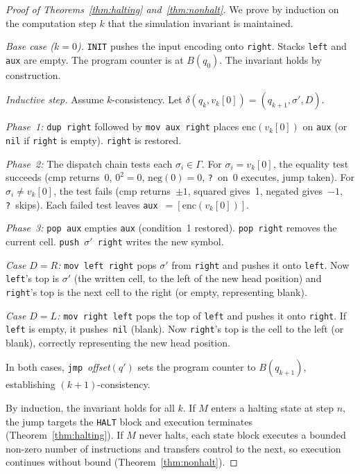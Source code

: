 \begin{proof}[Proof of Theorems~\ref{thm:halting} and~\ref{thm:nonhalt}]
We prove by induction on the computation step $k$ that the simulation invariant is maintained.

\textit{Base case ($k = 0$).}
\texttt{INIT} pushes the input encoding onto \texttt{right}. Stacks \texttt{left} and \texttt{aux} are empty. The program counter is at $B(q_0)$. The invariant holds by construction.

\textit{Inductive step.}
Assume $k$-consistency. Let $\delta(q_k, v_k[0]) = (q_{k+1}, \sigma', D)$.

\textit{Phase~1:} \texttt{dup right} followed by \texttt{mov aux right} places $\mathrm{enc}(v_k[0])$ on \texttt{aux} (or \texttt{nil} if \texttt{right} is empty). \texttt{right} is restored.

\textit{Phase~2:} The dispatch chain tests each $\sigma_i \in \Gamma$. For $\sigma_i = v_k[0]$, the equality test succeeds (cmp returns~0, $0^2 = 0$, $\mathrm{neg}(0) = 0$, \texttt{?}~on~0 executes, jump taken). For $\sigma_i \neq v_k[0]$, the test fails ($\mathrm{cmp}$ returns~$\pm 1$, squared gives~1, negated gives~$-1$, \texttt{?}~skips). Each failed test leaves \texttt{aux}~$= [\mathrm{enc}(v_k[0])]$.

\textit{Phase~3:} \texttt{pop aux} empties \texttt{aux} (condition~1 restored). \texttt{pop right} removes the current cell. \texttt{push $\sigma'$ right} writes the new symbol.

\textit{Case $D = R$:}
\texttt{mov left right} pops $\sigma'$ from \texttt{right} and pushes it onto \texttt{left}. Now \texttt{left}'s top is $\sigma'$ (the written cell, to the left of the new head position) and \texttt{right}'s top is the next cell to the right (or empty, representing blank).

\textit{Case $D = L$:}
\texttt{mov right left} pops the top of \texttt{left} and pushes it onto \texttt{right}. If \texttt{left} is empty, it pushes~\texttt{nil} (blank). Now \texttt{right}'s top is the cell to the left (or blank), correctly representing the new head position.

In both cases, \texttt{jmp}~\textit{offset}$(q')$ sets the program counter to $B(q_{k+1})$, establishing $(k+1)$-consistency.

By induction, the invariant holds for all $k$. If $M$ enters a halting state at step $n$, the jump targets the \texttt{HALT} block and execution terminates (Theorem~\ref{thm:halting}). If $M$ never halts, each state block executes a bounded non-zero number of instructions and transfers control to the next, so execution continues without bound (Theorem~\ref{thm:nonhalt}).
\end{proof}

